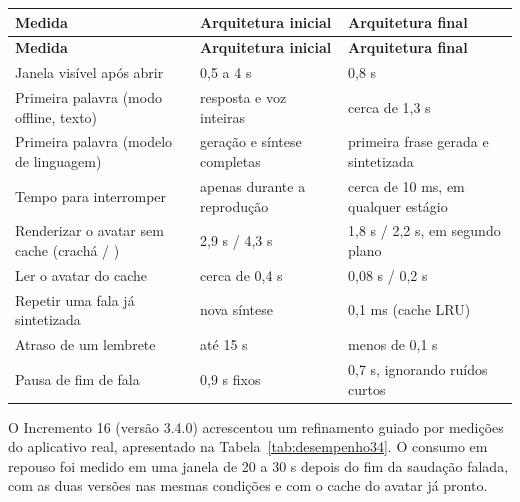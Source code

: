 \begin{singlespace}
\label{tab:desempenho}
\small
\begin{tabularx}{\textwidth}{LP{4.2cm}P{4.2cm}}
\toprule
\textbf{Medida} & \textbf{Arquitetura inicial} & \textbf{Arquitetura final} \\ \midrule
\endfirsthead
\toprule
\textbf{Medida} & \textbf{Arquitetura inicial} & \textbf{Arquitetura final} \\ \midrule
\endhead
Janela visível após abrir & 0,5 a 4 s & 0,8 s \\
Primeira palavra (modo offline, texto) & resposta e voz inteiras & cerca de 1,3 s \\
Primeira palavra (modelo de linguagem) & geração e síntese completas & primeira frase gerada e sintetizada \\
Tempo para interromper & apenas durante a reprodução & cerca de 10 ms, em qualquer estágio \\
Renderizar o avatar sem cache (crachá / ) & 2,9 s / 4,3 s & 1,8 s / 2,2 s, em segundo plano \\
Ler o avatar do cache & cerca de 0,4 s & 0,08 s / 0,2 s \\
Repetir uma fala já sintetizada & nova síntese & 0,1 ms (cache LRU) \\
Atraso de um lembrete & até 15 s & menos de 0,1 s \\
Pausa de fim de fala & 0,9 s fixos & 0,7 s, ignorando ruídos curtos \\
\bottomrule
\end{tabularx}
\end{singlespace}

O Incremento 16 (versão 3.4.0) acrescentou um refinamento guiado por medições do aplicativo real,
apresentado na Tabela~\ref{tab:desempenho34}. O consumo em repouso foi medido em uma janela de 20 a 30 s
depois do fim da saudação falada, com as duas versões nas mesmas condições e com o cache do avatar já
pronto.

